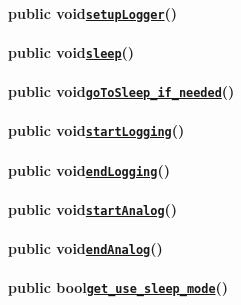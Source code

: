 \paragraph*{{\ttfamily public void}\href{#classLogger_1ab5e0bd543758c65a17b77553a0e9f0c9}{\tt {\ttfamily setup\+Logger}}{\ttfamily ()}}

\paragraph*{{\ttfamily public void}\href{#classLogger_1ad90ff8f29410f6b70cc6334391400a4e}{\tt {\ttfamily sleep}}{\ttfamily ()}}

\paragraph*{{\ttfamily public void}\href{#classLogger_1ad28cf6450ada04f0e1475998bede5b88}{\tt {\ttfamily go\+To\+Sleep\+\_\+if\+\_\+needed}}{\ttfamily ()}}

\paragraph*{{\ttfamily public void}\href{#classLogger_1a4a6c78dd1715b33ae4bbd6f66f116f77}{\tt {\ttfamily start\+Logging}}{\ttfamily ()}}

\paragraph*{{\ttfamily public void}\href{#classLogger_1aa82814d61687debcf3b8dd6f46c9d549}{\tt {\ttfamily end\+Logging}}{\ttfamily ()}}

\paragraph*{{\ttfamily public void}\href{#classLogger_1af936c7f58e23316abb5614cbd31c7ced}{\tt {\ttfamily start\+Analog}}{\ttfamily ()}}

\paragraph*{{\ttfamily public void}\href{#classLogger_1adca7be8a63592263c67f63766680d16f}{\tt {\ttfamily end\+Analog}}{\ttfamily ()}}

\paragraph*{{\ttfamily public bool}\href{#classLogger_1acc758b6fdaac8099c492929aa7f1691d}{\tt {\ttfamily get\+\_\+use\+\_\+sleep\+\_\+mode}}{\ttfamily ()}}

